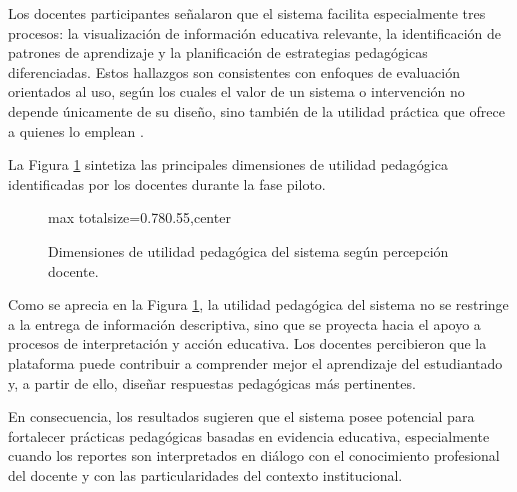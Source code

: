 \begin{refsection}
Los docentes participantes señalaron que el sistema facilita especialmente tres procesos: la visualización de información educativa relevante, la identificación de patrones de aprendizaje y la planificación de estrategias pedagógicas diferenciadas. Estos hallazgos son consistentes con enfoques de evaluación orientados al uso, según los cuales el valor de un sistema o intervención no depende únicamente de su diseño, sino también de la utilidad práctica que ofrece a quienes lo emplean \parencite{patton2015,rossi2018}.

La Figura \ref{fig:utilidad-docente} sintetiza las principales dimensiones de utilidad pedagógica identificadas por los docentes durante la fase piloto.

\begin{figure}[htbp]
\centering
\begin{adjustbox}{max totalsize={0.78\textwidth}{0.55\textheight},center}
\end{adjustbox}
\caption{Dimensiones de utilidad pedagógica del sistema según percepción docente.}
\label{fig:utilidad-docente}
\end{figure}

Como se aprecia en la Figura \ref{fig:utilidad-docente}, la utilidad pedagógica del sistema no se restringe a la entrega de información descriptiva, sino que se proyecta hacia el apoyo a procesos de interpretación y acción educativa. Los docentes percibieron que la plataforma puede contribuir a comprender mejor el aprendizaje del estudiantado y, a partir de ello, diseñar respuestas pedagógicas más pertinentes.

En consecuencia, los resultados sugieren que el sistema posee potencial para fortalecer prácticas pedagógicas basadas en evidencia educativa, especialmente cuando los reportes son interpretados en diálogo con el conocimiento profesional del docente y con las particularidades del contexto institucional.


\end{refsection}
